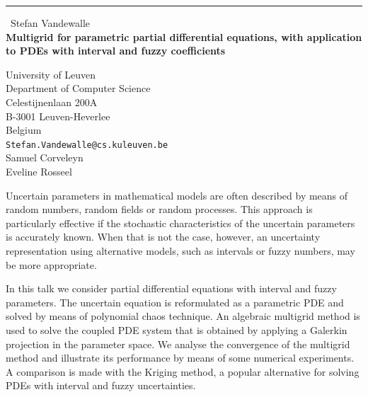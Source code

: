 \documentclass{report}
\begin{document}
\begin{center}
\rule{6in}{1pt} \
{\large Stefan Vandewalle \\
{\bf Multigrid for parametric partial differential equations, with application to PDEs with interval and fuzzy coefficients}}

University of Leuven \\ Department of Computer Science \\ Celestijnenlaan 200A \\ B-3001 Leuven-Heverlee \\ Belgium
\\
{\tt Stefan.Vandewalle@cs.kuleuven.be}\\
Samuel Corveleyn\\
Eveline Rosseel\end{center}


Uncertain parameters in mathematical models are often described by means
of random numbers, random fields or random processes. This approach is
particularly effective if the stochastic characteristics of the uncertain
parameters is accurately known. When that is not the case, however, an
uncertainty representation using alternative models, such as intervals
or fuzzy numbers, may be more appropriate.

In this talk we consider partial differential equations with interval and
fuzzy parameters. The uncertain equation is reformulated as a parametric
PDE and solved by means of polynomial chaos technique. An algebraic
multigrid method is used to solve the coupled PDE system that is obtained
by applying a Galerkin projection in the parameter space. We analyse the
convergence of the multigrid method and illustrate its performance by
means of some numerical experiments. A comparison is made with the
Kriging method, a popular alternative for solving PDEs with interval and
fuzzy
uncertainties.
\end{document}
